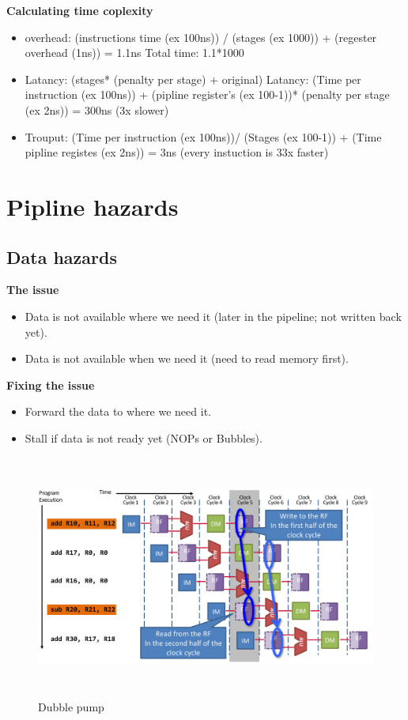 \documentclass{article}
\begin{document}
\textbf{Calculating time coplexity}
\begin{itemize}
\item  overhead: (instructions time (ex 100ns)) / (stages (ex 1000)) + (regester overhead (1ns)) = 1.1ns \newline
    Total time: 1.1*1000
\item  Latancy: (stages* (penalty per stage) + original) \newline
  Latancy: (Time per instruction (ex 100ns)) + (pipline register's (ex 100-1))* (penalty per stage (ex 2ns)) = 300ns (3x slower)
\item  Trouput: (Time per instruction (ex 100ns))/ (Stages (ex 100-1)) + (Time pipline registes (ex 2ns)) = 3ns (every instuction is 33x faster) 
\end{itemize}


\newpage


\section{Pipline hazards}

\subsection{Data hazards}
\textbf{The issue}
\begin{itemize}
\item  Data is not available where we need it (later in the pipeline; not written back yet).
\item  Data is not available when we need it (need to read memory first).
\end{itemize}

\textbf{Fixing the issue}
\begin{itemize}
\item  Forward the data to where we need it.
\item  Stall if data is not ready yet (NOPs or Bubbles).
\end{itemize}

\begin{figure}[h]
    \vspace{10mm}
    \centering
    \includegraphics[width=16cm, height=8cm]{image/dubble-pump.png} 
    \caption{Dubble pump}
\end{figure}
\end{document}
